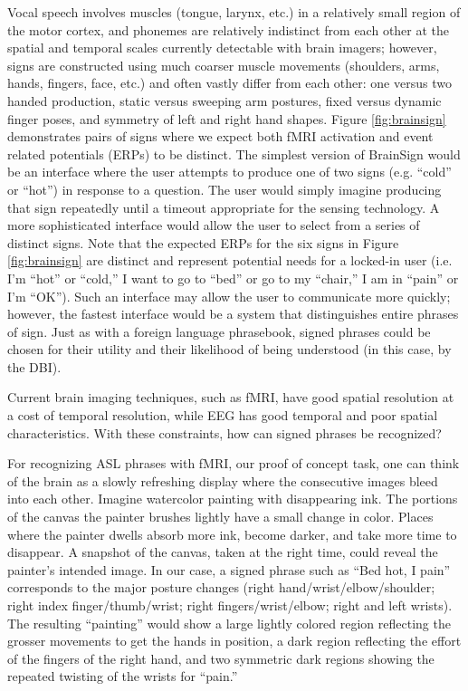 \documentclass{proposal}
\begin{document}
Vocal speech involves muscles (tongue, larynx, etc.) in a relatively small region of the motor cortex, and phonemes are relatively indistinct from each other at the spatial and temporal scales currently detectable with brain imagers; however, signs are constructed using much coarser muscle movements (shoulders, arms, hands, fingers, face, etc.) and often vastly differ from each other: one versus two handed production, static versus sweeping arm postures, fixed versus dynamic finger poses, and symmetry of left and right hand shapes.  Figure \ref{fig:brainsign} demonstrates pairs of signs where we expect both fMRI activation and event related potentials (ERPs) to be distinct.  The simplest version of BrainSign would be an interface where the user attempts to produce one of two signs (e.g. ``cold'' or ``hot'') in response to a question.  The user would simply imagine producing that sign repeatedly until a timeout appropriate for the sensing technology.  A more sophisticated interface would allow the user to select from a series of distinct signs.  Note that the expected ERPs for the six signs in Figure \ref{fig:brainsign} are distinct and represent potential needs for a locked-in user (i.e. I'm ``hot'' or ``cold,'' I want to go to ``bed'' or go to my ``chair,'' I am in ``pain'' or I'm ``OK'').  Such an interface may allow the user to communicate more quickly; however, the fastest interface would be a system that distinguishes entire phrases of sign. Just as with a foreign language phrasebook, signed phrases could be chosen for their utility and their likelihood of being understood (in this case, by the DBI).

Current brain imaging techniques, such as fMRI, have good spatial resolution at a cost of temporal resolution, while EEG has good temporal and poor spatial characteristics.  With these constraints, how can signed phrases be recognized?  

For recognizing ASL phrases with fMRI, our proof of concept task, one can think of the brain as a slowly refreshing display where the consecutive images bleed into each other.  Imagine watercolor painting with disappearing ink.  The portions of the canvas the painter brushes lightly have a small change in color. Places where the painter dwells absorb more ink, become darker, and take more time to disappear.  A snapshot of the canvas, taken at the right time, could reveal the painter's intended image. In our case, a signed phrase such as ``Bed hot, I pain'' corresponds to the major posture changes (right hand/wrist/elbow/shoulder; right index finger/thumb/wrist; right fingers/wrist/elbow; right and left wrists).  The resulting ``painting'' would show a large lightly colored region reflecting the grosser movements to get the hands in position, a dark region reflecting the effort of the fingers of the right hand, and two symmetric dark regions showing the repeated twisting of the wrists for ``pain.''
\end{document}
